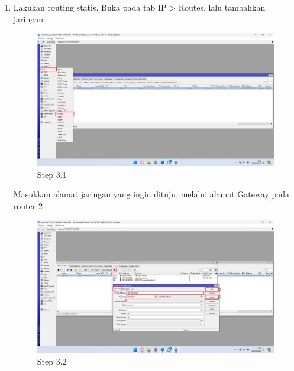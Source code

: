 \begin{center}
\begin{enumerate}
		\item Lakukan routing statis. Buka pada tab IP > Routes, lalu tambahkan jaringan. 
		\begin{figure}[H]
			\centering
			\includegraphics[width=0.9\linewidth]{P2/img/per1/pc1/Step 3.1.png}
			\caption{Step 3.1}
			\label{fig:Step 3.1(Per.1 PC1)}
		\end{figure}
		Masukkan alamat jaringan yang ingin dituju, melalui alamat Gateway pada router 2
		\begin{figure}[H]
			\centering
			\includegraphics[width=0.9\linewidth]{P2/img/per1/pc1/Step 3.2.png}
			\caption{Step 3.2}
			\label{fig:Step 3.2(Per.1 PC1)}
		\end{figure}
	\end{enumerate}


\end{center}
